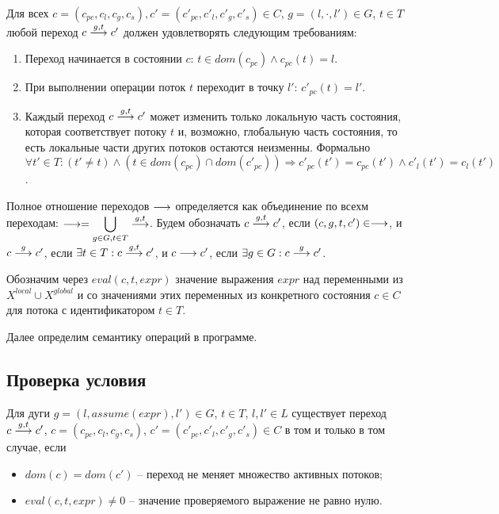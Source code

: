 Для всех $c=(c_{pc}, c_l, c_g, c_s), c'=(c'_{pc}, c'_l, c'_g, c'_s) \in C$, $g = (l, \cdot, l')\in G$, $t\in T$ любой переход $c \stackrel{g, t}{\longrightarrow} c'$ должен удовлетворять следующим требованиям:
\begin{enumerate}
\item Переход начинается в состоянии $c$: $t\in dom(c_{pc}) \land c_{pc}(t)=l$.
\item При выполнении операции поток $t$ переходит в точку $l'$: $c'_{pc}(t)=l'$.
\item Каждый переход $c \stackrel{g,t}{\longrightarrow} c'$ может изменить только локальную часть состояния, которая соответствует потоку $t$ и, возможно, глобальную часть состояния, то есть локальные части других потоков остаются неизменны.
Формально
$\forall t'\in T: (t'\neq t) \land (t \in dom(c_{pc})\cap dom(c'_{pc})) \Rightarrow c'_{pc}(t')=c_{pc}(t') \land c'_l(t')=c_l(t')$.
\end{enumerate}

Полное отношение переходов $\longrightarrow$ определяется как объединение по всехм переходам: 
$\longrightarrow = \displaystyle\bigcup_{g \in G,t \in T} \stackrel{g,t}{\longrightarrow}$.
Будем обозначать $c \stackrel{g, t}{\longrightarrow} c'$, если $(c, g, t, c') \in \longrightarrow$, и
$c \stackrel{g}{\longrightarrow} c'$, если $\exists t\in T: c \stackrel{g,t}{\longrightarrow} c'$, и 
$c \longrightarrow c'$, если $\exists g\in G: c \stackrel{g}{\longrightarrow} c'$. 

Обозначим через $eval(c, t, expr)$ значение выражения $expr$ над переменными из $X^{local} \cup X^{global}$ и со значениями этих переменных из конкретного состояния $c \in C$ для потока с идентификатором $t \in T$. %

Далее определим семантику операций в программе.

\subsection{Проверка условия}
Для дуги $g = (l, assume(expr), l') \in G$, $t\in T$, $l, l' \in L$ существует переход $c \stackrel{g, t}{\longrightarrow} c'$, $c=(c_{pc}, c_l, c_g, c_s)$, $c'=(c'_{pc}, c'_l, c'_g, c'_s) \in C$ в том и только в том случае, если
\begin{itemize}
\item $dom(c)=dom(c')$ -- переход не меняет множество активных потоков;
\item $eval(c, t, expr) \neq 0$ -- значение проверяемого выражение не равно нулю.
\end{itemize}

